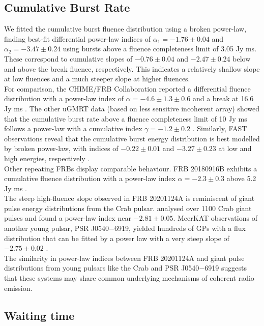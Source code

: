 \documentclass[preprint2, trackchanges]{aastex631}
\begin{document}
\subsection{Cumulative Burst Rate}
We fitted the cumulative burst fluence distribution using a broken power-law, finding best-fit differential power-law indices of $\alpha_1 = -1.76 \pm 0.04$ and $\alpha_2 = -3.47 \pm 0.24$ using bursts above a fluence completeness limit of 3.05 Jy ms. These correspond to cumulative slopes of $-0.76 \pm 0.04$ and $-2.47 \pm 0.24$ below and above the break fluence, respectively. This indicates a relatively shallow slope at low fluences and a much steeper slope at higher fluences.
\\
For comparison, the CHIME/FRB Collaboration reported a differential fluence distribution with a power-law index of $\alpha = -4.6 \pm 1.3 \pm 0.6$ and a break at 16.6 Jy ms \citep{Lanman_2022}.
The other uGMRT data (based on less sensitive incoherent array) showed that the cumulative burst rate above a fluence completeness limit of 10 Jy ms follows a power-law with a cumulative index $\gamma = -1.2 \pm 0.2$ \citep{2022MNRAS.509.2209M}. Similarly, FAST observations reveal that the cumulative burst energy distribution is best modelled by broken power-law, with indices of $-0.22 \pm 0.01$ and $-3.27 \pm 0.23$ at low and high energies, respectively \citep{Zhang_2022}.
\\
Other repeating FRBs display comparable behaviour. FRB 20180916B exhibits a cumulative fluence distribution with a power-law index $\alpha = -2.3 \pm 0.3$ above 5.2 Jy ms \citep{2020Natur.582..351C}.  
\\
The steep high-fluence slope observed in FRB 20201124A is reminiscent of giant pulse energy distributions from the Crab pulsar. \citet{2019MNRAS.490L..12B} analysed over 1100 Crab giant pulses and found a power-law index near $-2.81 \pm 0.05$. MeerKAT observations of another young pulsar, PSR J0540$-$6919, yielded hundreds of GPs with a flux distribution that can be fitted by a power law with a very steep slope of $-2.75 \pm 0.02$ \citep{2021MNRAS.505.4468G}. 
\\
The similarity in power-law indices between FRB 20201124A and giant pulse distributions from young pulsars like the Crab and PSR J0540$-$6919 suggests that these systems may share common underlying mechanisms of coherent radio emission.

\subsection{Waiting time}
\end{document}
